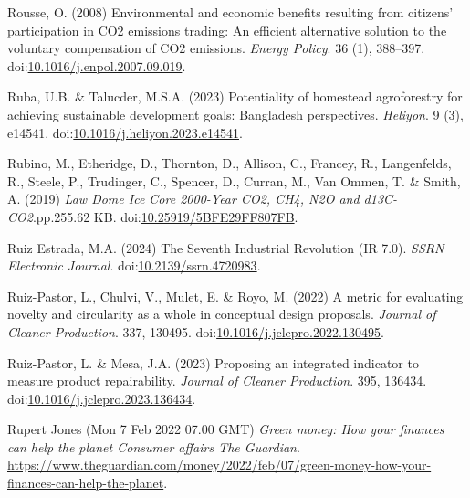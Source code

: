 \documentclass[
  letterpaper,
  DIV=11,
  numbers=noendperiod]{scrartcl}
\newlength{\cslhangindent}
\newenvironment{CSLReferences}[2] %
 {\begin{list}{}{%
  \setlength{\itemindent}{0pt}
  \setlength{\leftmargin}{0pt}
  \setlength{\parsep}{0pt}
  \ifodd #1
   \setlength{\leftmargin}{\cslhangindent}
   \setlength{\itemindent}{-1\cslhangindent}
  \fi
  \setlength{\itemsep}{#2\baselineskip}}}
 {\end{list}}
\begin{document}
\begin{CSLReferences}{0}{1}
Rousse, O. (2008) Environmental and economic benefits resulting from
citizens' participation in {CO2} emissions trading: {An} efficient
alternative solution to the voluntary compensation of {CO2} emissions.
\emph{Energy Policy}. 36 (1), 388--397.
doi:\href{https://doi.org/10.1016/j.enpol.2007.09.019}{10.1016/j.enpol.2007.09.019}.

Ruba, U.B. \& Talucder, M.S.A. (2023) Potentiality of homestead
agroforestry for achieving sustainable development goals: {Bangladesh}
perspectives. \emph{Heliyon}. 9 (3), e14541.
doi:\href{https://doi.org/10.1016/j.heliyon.2023.e14541}{10.1016/j.heliyon.2023.e14541}.

Rubino, M., Etheridge, D., Thornton, D., Allison, C., Francey, R.,
Langenfelds, R., Steele, P., Trudinger, C., Spencer, D., Curran, M., Van
Ommen, T. \& Smith, A. (2019) \emph{Law {Dome Ice Core} 2000-{Year CO2},
{CH4}, {N2O} and {d13C-CO2}}.pp.255.62 KB.
doi:\href{https://doi.org/10.25919/5BFE29FF807FB}{10.25919/5BFE29FF807FB}.

Ruiz Estrada, M.A. (2024) The {Seventh Industrial Revolution} ({IR}
7.0). \emph{SSRN Electronic Journal}.
doi:\href{https://doi.org/10.2139/ssrn.4720983}{10.2139/ssrn.4720983}.

Ruiz-Pastor, L., Chulvi, V., Mulet, E. \& Royo, M. (2022) A metric for
evaluating novelty and circularity as a whole in conceptual design
proposals. \emph{Journal of Cleaner Production}. 337, 130495.
doi:\href{https://doi.org/10.1016/j.jclepro.2022.130495}{10.1016/j.jclepro.2022.130495}.

Ruiz-Pastor, L. \& Mesa, J.A. (2023) Proposing an integrated indicator
to measure product repairability. \emph{Journal of Cleaner Production}.
395, 136434.
doi:\href{https://doi.org/10.1016/j.jclepro.2023.136434}{10.1016/j.jclepro.2023.136434}.

Rupert Jones (Mon 7 Feb 2022 07.00 GMT) \emph{Green money: How your
finances can help the planet {\textbar} {Consumer} affairs {\textbar}
{The Guardian}}.
\url{https://www.theguardian.com/money/2022/feb/07/green-money-how-your-finances-can-help-the-planet}.


\end{CSLReferences}
\end{document}
